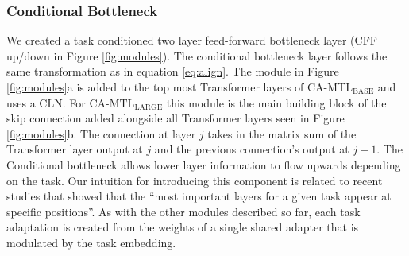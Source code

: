 \documentclass{article} \usepackage{iclr2021_conference,times}
\begin{document}
\subsubsection{Conditional Bottleneck}
\label{sec:other_adaptive_layers}
 We created a task conditioned two layer feed-forward bottleneck layer (CFF up/down in Figure \ref{fig:modules}). The conditional bottleneck layer follows the same transformation as in equation \ref{eq:align}. The module in Figure \ref{fig:modules}a  is added to the top most Transformer layers of $\text{CA-MTL}_{\text{BASE}}$ and uses a CLN. For $\text{CA-MTL}_{\text{LARGE}}$  this module is the main building block of the skip connection added alongside all Transformer layers seen in Figure \ref{fig:modules}b. The connection at layer $j$ takes in the matrix sum of the Transformer layer output at $j$ and the previous connection's output at $j-1$. The Conditional bottleneck allows lower layer information to flow upwards depending on the task. Our intuition for introducing this component is related to recent studies \citep{bert_classicnlp} that showed that the ``most important layers for a given task appear at specific positions''. As with the other modules described so far, each task adaptation is created from the weights of a single shared adapter that is modulated by the task embedding.
\end{document}
